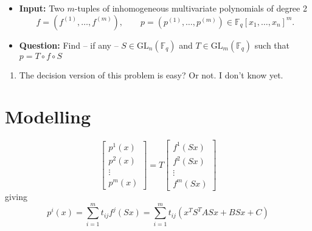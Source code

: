 \documentclass[12pt]{article}
\newcommand{\F}{\mathbb{F}}
\newcommand{\GL}{\text{GL}}
\begin{document}
\begin{center}
    \begin{itemize}
	\item \textbf{Input:} Two $m$-tuples of inhomogeneous multivariate polynomials of degree 2
	    \[
		f = (f^{(1)},\ldots, f^{(m)}), \qquad p = (p^{(1)}, \ldots, p^{(m)}) \in \F_q[x_1, \ldots, x_n]^m.
	    \]

	\item \textbf{Question:} Find -- if any -- $S \in \GL_n(\F_q)$ and $T \in \GL_m(\F_q)$ such that $p = T \circ f \circ S$
    \end{itemize}
\end{center}

\begin{enumerate}
    \item The decision version of this problem is easy? Or not. I don't know yet.
\end{enumerate}


\section{Modelling}
\begin{equation}
    \begin{bmatrix}
	p^1(x) \\ p^2(x) \\ \vdots \\ p^m(x)
    \end{bmatrix}
    = T
    \begin{bmatrix}
	f^1(Sx) \\ f^2 (Sx) \\ \vdots \\ f^m(Sx)
    \end{bmatrix}
\end{equation}
giving
\begin{equation}
    p^i(x) = \sum_{i=1}^m t_{ij} f^j(Sx) = \sum_{i=1}^m t_{ij}(x^TS^TASx + BSx +C)
\end{equation}
\end{document}
